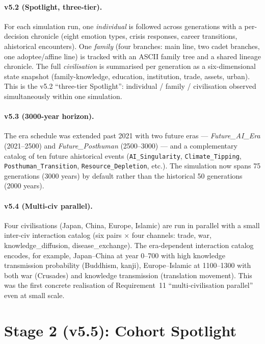 \paragraph{v5.2 (Spotlight, three-tier).}
For each simulation run, one \emph{individual} is followed across
generations with a per-decision chronicle (eight emotion types,
crisis responses, career transitions, ahistorical encounters). One
\emph{family} (four branches: main line, two cadet branches, one
adoptee/affine line) is tracked with an ASCII family tree and a
shared lineage chronicle. The full \emph{civilisation} is summarised
per generation as a six-dimensional state snapshot
(family-knowledge, education, institution, trade, assets, urban).
This is the v5.2 ``three-tier Spotlight'': individual / family /
civilisation observed simultaneously within one simulation.

\paragraph{v5.3 (3000-year horizon).}
The era schedule was extended past 2021 with two future eras —
\emph{Future\_AI\_Era} (2021--2500) and \emph{Future\_Posthuman}
(2500--3000) — and a complementary catalog of ten future
ahistorical events (\texttt{AI\_Singularity},
\texttt{Climate\_Tipping}, \texttt{Posthuman\_Transition},
\texttt{Resource\_Depletion}, etc.). The simulation now spans 75
generations (3000 years) by default rather than the historical 50
generations (2000 years).

\paragraph{v5.4 (Multi-civ parallel).}
Four civilisations (Japan, China, Europe, Islamic) are run in
parallel with a small inter-civ interaction catalog (six pairs ×
four channels: trade, war, knowledge\_diffusion,
disease\_exchange). The era-dependent interaction catalog encodes,
for example, Japan--China at year 0--700 with high knowledge
transmission probability (Buddhism, kanji), Europe--Islamic at
1100--1300 with both war (Crusades) and knowledge transmission
(translation movement). This was the first concrete realisation of
Requirement~11 ``multi-civilisation parallel'' even at small
scale.

\section{Stage 2 (v5.5): Cohort Spotlight}
\label{sec:stage2-v55}

